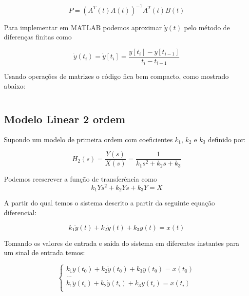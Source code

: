 \documentclass[a4paper,11pt]{article}
\begin{document}
\begin{equation}
    P = \left(A^T(t) A(t)\right)^{-1} A^T(t) B(t)
\end{equation}

Para implementar em MATLAB podemos aproximar $\dot{y}(t)$ pelo método de diferenças finitas como

\begin{equation}
\dot{y}(t_i) = \dot{y}[t_i] = \frac{y[t_i] - y[t_{i-1}]}{t_i - t_{i-1}}
\end{equation}

Usando operações de matrizes o código fica bem compacto, como mostrado abaixo:

\inputminted[frame=single,framesep=10pt]{matlab}{../src/matlab/firstordertf.m}

\subsection{Modelo Linear 2 ordem}

Supondo um modelo de primeira ordem com coeficientes $k_1$, $k_2$ e $k_3$ definido por:

\begin{equation}\label{eq:secondordertf}
    H_2(s) = \frac{Y(s)}{X(s)} = \frac{1}{k_1 s^2+ k_2 s+ k_3}
\end{equation}


Podemos reescrever a função de transferência como
\begin{equation}
k_1 Ys^2 + k_2 Ys + k_3 Y  = X
\end{equation}

A partir do qual temos o sistema descrito a partir da seguinte equação diferencial:

\begin{equation}
k_1 \ddot{y}(t) + k_2 \dot{y}(t) + k_3 y(t) = x(t)
\end{equation}

Tomando os valores de entrada e saída do sistema em diferentes instantes para um sinal de entrada temos:

\begin{equation}
\left\{\begin{array}{c}
    k_1 \ddot{y}(t_0) + k_2 \dot{y}(t_0) + k_3 y(t_0) = x(t_0)  \\
    \dots\\
    k_1 \ddot{y}(t_i) + k_2 \dot{y}(t_i) + k_3 y(t_i) = x(t_i)  \\
\end{array} \right.
\end{equation}
\end{document}

